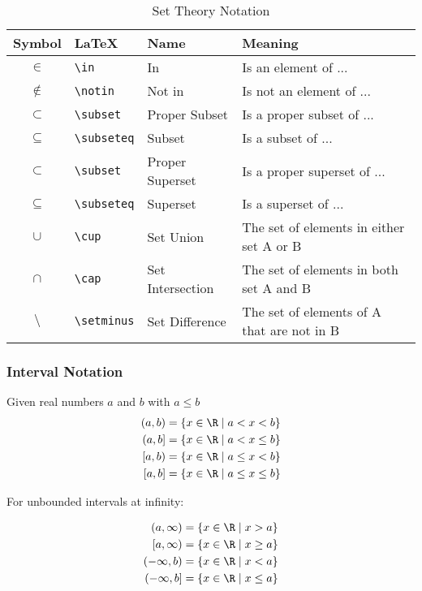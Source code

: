 \documentclass[11pt]{article}
\begin{document}
\begin{table}[!htbp]
    \centering
    \caption{Set Theory Notation}
    \begin{tabular}{ c l l l }
        \toprule
        Symbol      & LaTeX             & Name              & Meaning \\
        \midrule
        $\in$       & \verb|\in|        & In                & Is an element of ... \\
        $\notin$    & \verb|\notin|     & Not in            & Is not an element of ... \\
        $\subset$   & \verb|\subset|    & Proper Subset     & Is a proper subset of ... \\
        $\subseteq$ & \verb|\subseteq|  & Subset            & Is a subset of ... \\
        $\subset$   & \verb|\subset|    & Proper Superset   & Is a proper superset of ... \\
        $\subseteq$ & \verb|\subseteq|  & Superset          & Is a superset of ... \\
        $\cup$      & \verb|\cup|       & Set Union         & The set of elements in either set A or B \\
        $\cap$      & \verb|\cap|       & Set Intersection  & The set of elements in both set A and B \\
        $\setminus$ & \verb|\setminus|  & Set Difference    & The set of elements of A that are not in B \\
        \bottomrule
    \end{tabular}
    \label{tab:tbl-set-theory-notation}
\end{table}

\subsubsection{Interval Notation}
\begin{definition}\label{def:interval-notation}
    Given real numbers $a$ and $b$ with $a \leq b$
    \begin{align*}
        (a, b) = \{ x \in \R \mid a < x < b \} \\
        (a, b] = \{ x \in \R \mid a < x \leq b \} \\
        [a, b) = \{ x \in \R \mid a \leq x < b \} \\
        [a, b] = \{ x \in \R \mid a \leq x \leq b \}
    \end{align*}

    For unbounded intervals at infinity:

    \begin{align*}
        (a, \infty) = \{ x \in \R \mid x > a \} \\
        [a, \infty) = \{ x \in \R \mid x \geq a \} \\
        (-\infty, b) = \{ x \in \R \mid x < a \} \\
        (-\infty, b] = \{ x \in \R \mid x \leq a \}
    \end{align*}
\end{definition}
\end{document}
